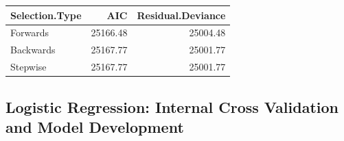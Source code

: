 \documentclass[american,]{article}
\begin{document}
\begin{table}[H]
\centering
\begin{tabular}{lrr}
\toprule
Selection.Type & AIC & Residual.Deviance\\
\midrule
Forwards & 25166.48 & 25004.48\\
Backwards & 25167.77 & 25001.77\\
Stepwise & 25167.77 & 25001.77\\
\bottomrule
\end{tabular}
\end{table}

\hypertarget{logistic-regression-internal-cross-validation-and-model-development}{%
\subsection{\texorpdfstring{\textbf{Logistic Regression: Internal Cross Validation and Model Development}}{Logistic Regression: Internal Cross Validation and Model Development}}\label{logistic-regression-internal-cross-validation-and-model-development}}
\end{document}
